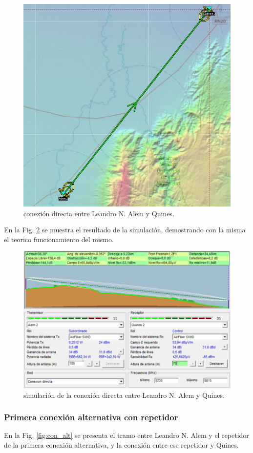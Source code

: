 \documentclass[11pt,a4paper]{article}
\begin{document}
\begin{figure}[htbp]
  \centering
  \includegraphics[width=0.55\linewidth]{fotos_ema/con_directa.jpg}
  \caption{conexión directa entre Leandro N. Alem y Quines.}
  \label{fig:con_directa}
\end{figure}
En la Fig. \ref{fig:sim_directa} se muestra el resultado de la simulación, demostrando con la misma el teorico funcionamiento del mismo.
\begin{figure}[htbp]
  \centering
  \includegraphics[width=0.7\linewidth]{fotos_ema/sim_directa.png}
  \caption{simulación de la conexión directa entre Leandro N. Alem y Quines.}
  \label{fig:sim_directa}
\end{figure}

\subsubsection{Primera conexión alternativa con repetidor}
En la Fig. \ref{fig:con_alt} se presenta el tramo entre Leandro N. Alem y el repetidor de la primera conexión alternativa, y la conexión entre ese repetidor y Quines.
\end{document}
